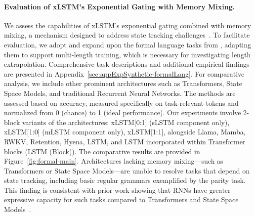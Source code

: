 \paragraph{Evaluation of xLSTM’s Exponential Gating with Memory Mixing.} We assess the capabilities of xLSTM’s exponential gating combined with memory mixing, a mechanism designed to address state tracking challenges~\citep{Merrill:24, Merrill:23}. To facilitate evaluation, we adopt and expand upon the formal language tasks from \citet{Deletang:23}, adapting them to support multi-length training, which is necessary for investigating length extrapolation. Comprehensive task descriptions and additional empirical findings are presented in Appendix~\ref{sec:appExpSynthetic-formalLang}. For comparative analysis, we include other prominent architectures such as Transformers, State Space Models, and traditional Recurrent Neural Networks. The methods are assessed based on accuracy, measured specifically on task-relevant tokens and normalized from 0 (chance) to 1 (ideal performance). Our experiments involve 2-block variants of the architectures: xLSTM[0:1] (sLSTM component only), xLSTM[1:0] (mLSTM component only), xLSTM[1:1], alongside Llama, Mamba, RWKV, Retention, Hyena, LSTM, and LSTM incorporated within Transformer blocks (LSTM (Block)). The comparative results are provided in Figure~\ref{fig:formal-main}. Architectures lacking memory mixing—such as Transformers or State Space Models—are unable to resolve tasks that depend on state tracking, including basic regular grammars exemplified by the parity task. This finding is consistent with prior work showing that RNNs have greater expressive capacity for such tasks compared to Transformers and State Space Models~\citep{Merrill:24, Merrill:23, Deletang:23}.

